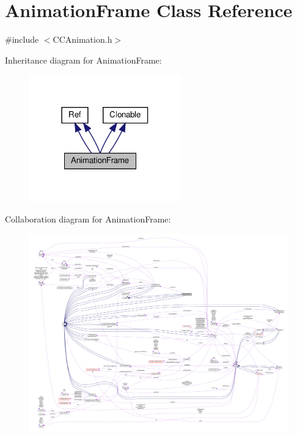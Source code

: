\hypertarget{classAnimationFrame}{}\section{Animation\+Frame Class Reference}
\label{classAnimationFrame}


{\ttfamily \#include $<$C\+C\+Animation.\+h$>$}



Inheritance diagram for Animation\+Frame\+:
\nopagebreak
\begin{figure}[H]
\begin{center}
\leavevmode
\includegraphics[width=186pt]{classAnimationFrame__inherit__graph}
\end{center}
\end{figure}


Collaboration diagram for Animation\+Frame\+:
\nopagebreak
\begin{figure}[H]
\begin{center}
\leavevmode
\includegraphics[width=350pt]{classAnimationFrame__coll__graph}
\end{center}
\end{figure}
